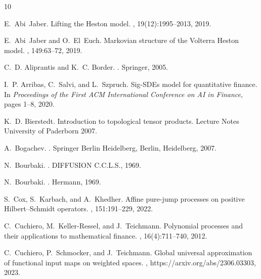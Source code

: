 \documentclass[a4paper,12pt]{article}
\theoremstyle{definition}
\theoremstyle{remark}
\numberwithin{equation}{section}
\numberwithin{theorem}{section}
\begin{document}
%
%


\begin{thebibliography}{10}

E.~Abi~Jaber.
\newblock Lifting the {H}eston model.
, 19(12):1995--2013, 2019.

E.~Abi~Jaber and O.~El~Euch.
\newblock Markovian structure of the {V}olterra {H}eston model.
, 149:63--72, 2019.

C.~D. Aliprantis and K.~C. Border.
.
\newblock Springer, 2005.

I.~P. Arribas, C.~Salvi, and L.~Szpruch.
\newblock Sig-{SDE}s model for quantitative finance.
\newblock In {\em Proceedings of the First ACM International Conference on AI
  in Finance}, pages 1--8, 2020.

K.~D. Bierstedt.
\newblock Introduction to topological tensor products.
\newblock Lecture Notes University of Paderborn 2007.

A.~Bogachev.
.
\newblock Springer Berlin Heidelberg, Berlin, Heidelberg, 2007.

N.~Bourbaki.
.
\newblock DIFFUSION C.C.L.S., 1969.

N.~Bourbaki.
.
\newblock Hermann, 1969.

S.~Cox, S.~Karbach, and A.~Khedher.
\newblock Affine pure-jump processes on positive {H}ilbert--{S}chmidt
  operators.
, 151:191--229,
  2022.

C.~Cuchiero, M.~Keller-Ressel, and J.~Teichmann.
\newblock Polynomial processes and their applications to mathematical finance.
, 16(4):711--740, 2012.

C.~Cuchiero, P.~Schmocker, and J.~Teichmann.
\newblock Global universal approximation of functional input maps on weighted
  spaces.
, https://arxiv.org/abs/2306.03303, 2023.


\end{thebibliography}
\end{document}
